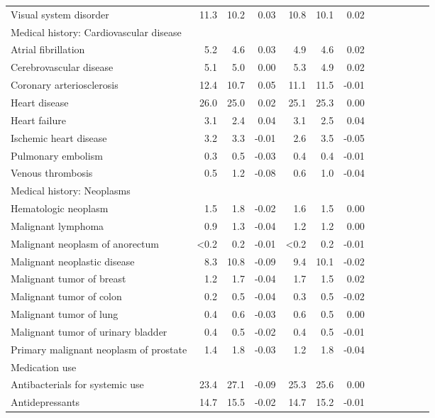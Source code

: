 \documentclass[11pt,]{article}
\begin{document}
\begin{longtable}{lrrrrrrrrrrrr}
      Visual system disorder & 11.3 & 10.2 &  0.03 & 10.8 & 10.1 &  0.02 \\ 
  Medical history: Cardiovascular disease &    &    &     &    &    &     \\ 
      Atrial fibrillation &  5.2 &  4.6 &  0.03 &  4.9 &  4.6 &  0.02 \\ 
      Cerebrovascular disease &  5.1 &  5.0 &  0.00 &  5.3 &  4.9 &  0.02 \\ 
      Coronary arteriosclerosis & 12.4 & 10.7 &  0.05 & 11.1 & 11.5 & -0.01 \\ 
      Heart disease & 26.0 & 25.0 &  0.02 & 25.1 & 25.3 &  0.00 \\ 
      Heart failure &  3.1 &  2.4 &  0.04 &  3.1 &  2.5 &  0.04 \\ 
      Ischemic heart disease &  3.2 &  3.3 & -0.01 &  2.6 &  3.5 & -0.05 \\ 
      Pulmonary embolism &  0.3 &  0.5 & -0.03 &  0.4 &  0.4 & -0.01 \\ 
      Venous thrombosis &  0.5 &  1.2 & -0.08 &  0.6 &  1.0 & -0.04 \\ 
  Medical history: Neoplasms &    &    &     &    &    &     \\ 
      Hematologic neoplasm &  1.5 &  1.8 & -0.02 &  1.6 &  1.5 &  0.00 \\ 
      Malignant lymphoma &  0.9 &  1.3 & -0.04 &  1.2 &  1.2 &  0.00 \\ 
      Malignant neoplasm of anorectum & <0.2 &  0.2 & -0.01 & <0.2 &  0.2 & -0.01 \\ 
      Malignant neoplastic disease &  8.3 & 10.8 & -0.09 &  9.4 & 10.1 & -0.02 \\ 
      Malignant tumor of breast &  1.2 &  1.7 & -0.04 &  1.7 &  1.5 &  0.02 \\ 
      Malignant tumor of colon &  0.2 &  0.5 & -0.04 &  0.3 &  0.5 & -0.02 \\ 
      Malignant tumor of lung &  0.4 &  0.6 & -0.03 &  0.6 &  0.5 &  0.00 \\ 
      Malignant tumor of urinary bladder &  0.4 &  0.5 & -0.02 &  0.4 &  0.5 & -0.01 \\ 
      Primary malignant neoplasm of prostate &  1.4 &  1.8 & -0.03 &  1.2 &  1.8 & -0.04 \\ 
  Medication use &    &    &     &    &    &     \\ 
      Antibacterials for systemic use & 23.4 & 27.1 & -0.09 & 25.3 & 25.6 &  0.00 \\ 
      Antidepressants & 14.7 & 15.5 & -0.02 & 14.7 & 15.2 & -0.01 \\ 

\end{longtable}
\end{document}
